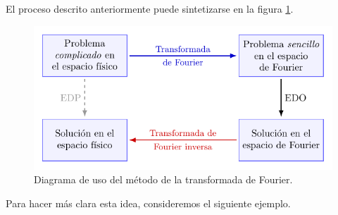 El proceso descrito anteriormente puede sintetizarse en la figura \ref{fig:Diagrama-Fourier}.
\begin{figure}[htbp]
    \centering
    \includegraphics[width = 12cm]{Figuras/Diagrama_Fourier.pdf}
    \caption{Diagrama de uso del método de la transformada de Fourier.}
    \label{fig:Diagrama-Fourier}
\end{figure}

Para hacer más clara esta idea, consideremos el siguiente ejemplo.

